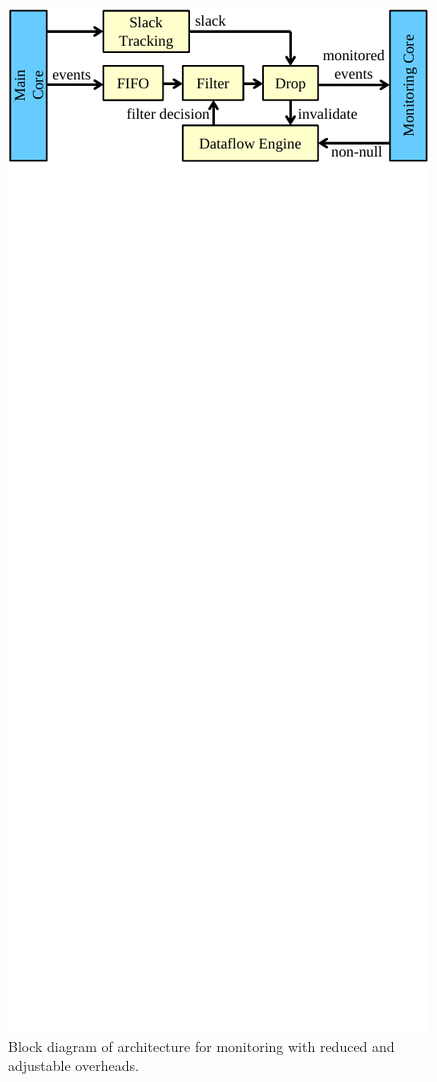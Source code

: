 \begin{figure}
  \begin{center}
    \includegraphics[width=\columnwidth]{figs/architecture_overview.pdf}
    \vspace{-0.3in}
    \caption{Block diagram of architecture for monitoring with reduced and adjustable overheads.}
    \label{fig:arch.overview}
    \vspace{-0.1in}
  \end{center}
\end{figure}

